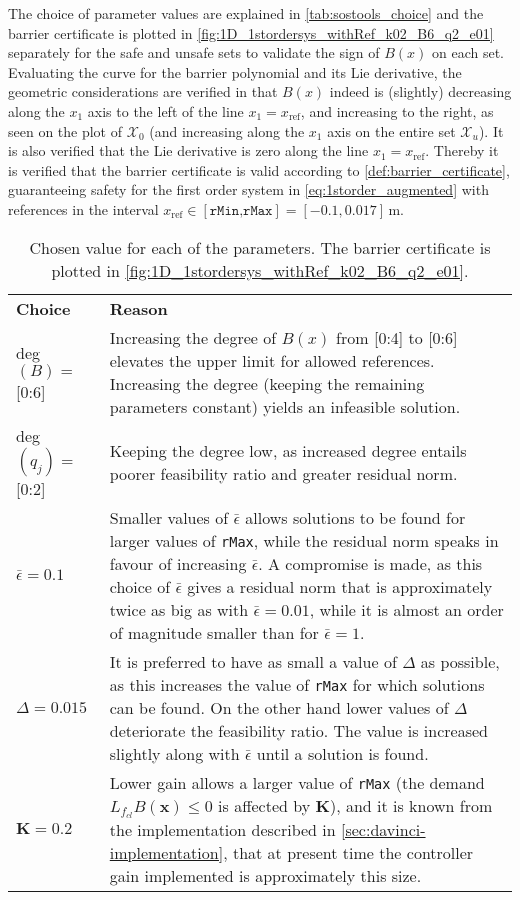 The choice of parameter values are explained in \autoref{tab:sostools_choice} and the barrier certificate is plotted in \autoref{fig:1D_1stordersys_withRef_k02_B6_q2_e01} separately for the safe and unsafe sets to validate the sign of $B(x)$ on each set. 
Evaluating the curve for the barrier polynomial and its Lie derivative,  the geometric considerations are verified in that $B(x)$ indeed is (slightly) decreasing along the $x_1$ axis to the left of the line $x_1=x_\text{ref}$, and increasing to the right, as seen on the plot of $\mathcal{X}_0$ (and increasing along the $x_1$ axis on the entire set $\mathcal{X}_u$). It is also verified that the Lie derivative is zero along the line $x_1=x_\text{ref}$. Thereby it is verified that the barrier certificate is valid according to \autoref{def:barrier_certificate},  guaranteeing  safety for the first order system in \autoref{eq:1storder_augmented} with references in the interval $x_\text{ref}\in [\texttt{rMin,rMax}]=[-0.1,0.017]$\,m.



\begin{table}[H]
	\begin{tabularx}{\textwidth}{l X}
		\rowcolor{HeaderBlue}
		\textbf{Choice} & \textbf{Reason}\\
		deg$(B)=$ [0:6] & Increasing the degree of $B(x)$ from [0:4] to [0:6] elevates the upper limit for allowed references. Increasing the degree (keeping the remaining parameters constant) yields an infeasible solution. \\
		\rowcolor{textBlue}
		deg$(q_j)=$ [0:2] & Keeping the degree low, as increased degree entails poorer feasibility ratio and greater residual norm.\\
		$\bar{\epsilon}=0.1$ & Smaller values of  $\bar{\epsilon}$ allows solutions to be found for larger values of \texttt{rMax}, while the residual norm  speaks in favour of increasing $\bar{\epsilon}$. A compromise is made, as this choice of $\bar{\epsilon}$ gives a residual norm that is approximately twice as big as with $\bar{\epsilon}=0.01$, while it is almost an order of magnitude smaller than for $\bar{\epsilon}=1$.\\
		\rowcolor{textBlue}
		$\Delta=0.015$ & It is preferred to have as small a value of $\Delta$ as possible, as this increases the value of \texttt{rMax} for which solutions can be found. On the other hand lower  values of $\Delta$ deteriorate the feasibility ratio. The value is increased slightly along with $\bar{\epsilon}$ until a solution is found. \\
		$\textbf{K}=0.2$ & Lower gain allows a larger value of \texttt{rMax} (the demand $L_{f_{cl}}B(\textbf{x}) \leq 0$ is affected by $\textbf{K}$), and it is known from the implementation described in \autoref{sec:davinci-implementation}, that at present time the controller gain implemented is approximately this size.
	\end{tabularx}
	\caption{Chosen value for each of the parameters. The barrier certificate is plotted in \autoref{fig:1D_1stordersys_withRef_k02_B6_q2_e01}.}
	\label{tab:sostools_choice}
\end{table}


